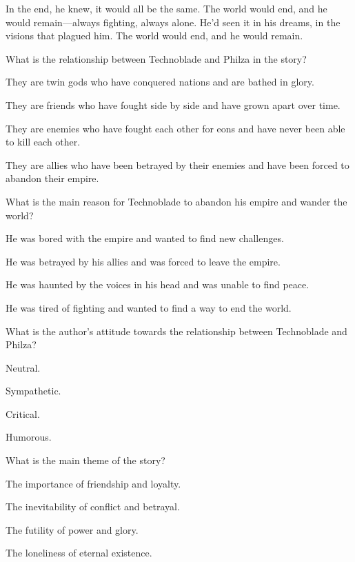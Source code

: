 \documentclass{exam-zh}
\begin{document}
In the end, he knew, it would all be the same. The world would end, and he would remain—always fighting, always alone. He'd seen it in his dreams, in the visions that plagued him. The world would end, and he would remain.

\begin{question}
What is the relationship between Technoblade and Philza in the story?
\begin{choices}
  \item They are twin gods who have conquered nations and are bathed in glory.
  \item They are friends who have fought side by side and have grown apart over time.
  \item They are enemies who have fought each other for eons and have never been able to kill each other.
  \item They are allies who have been betrayed by their enemies and have been forced to abandon their empire.
\end{choices}
\end{question}

\begin{question}
What is the main reason for Technoblade to abandon his empire and wander the world?
\begin{choices}
  \item He was bored with the empire and wanted to find new challenges.
  \item He was betrayed by his allies and was forced to leave the empire.
  \item He was haunted by the voices in his head and was unable to find peace.
  \item He was tired of fighting and wanted to find a way to end the world.
\end{choices}
\end{question}

\begin{question}
What is the author's attitude towards the relationship between Technoblade and Philza?
\begin{choices}
  \item Neutral.
  \item Sympathetic.
  \item Critical.
  \item Humorous.
\end{choices}
\end{question}

\begin{question}
What is the main theme of the story?
\begin{choices}
  \item The importance of friendship and loyalty.
  \item The inevitability of conflict and betrayal.
  \item The futility of power and glory.
  \item The loneliness of eternal existence.
\end{choices}
\end{question}
\end{document}
